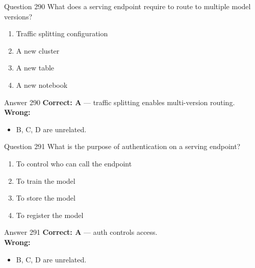 \documentclass[aspectratio=169,11pt]{beamer}
\begin{document}
	\begin{frame}{Question 290}
		What does a serving endpoint require to route to multiple model versions?
		\begin{enumerate}[label=\Alph*.]
			\item Traffic splitting configuration
			\item A new cluster
			\item A new table
			\item A new notebook
		\end{enumerate}
	\end{frame}
	\begin{frame}{Answer 290}
		\textbf{Correct: A} --- traffic splitting enables multi-version routing.\\
		\vspace{0.5em}
		\textbf{Wrong:}
		\begin{itemize}
			\item B, C, D are unrelated.
		\end{itemize}
	\end{frame}
	
	\begin{frame}{Question 291}
		What is the purpose of authentication on a serving endpoint?
		\begin{enumerate}[label=\Alph*.]
			\item To control who can call the endpoint
			\item To train the model
			\item To store the model
			\item To register the model
		\end{enumerate}
	\end{frame}
	\begin{frame}{Answer 291}
		\textbf{Correct: A} --- auth controls access.\\
		\vspace{0.5em}
		\textbf{Wrong:}
		\begin{itemize}
			\item B, C, D are unrelated.
		\end{itemize}
	\end{frame}
	
\end{document}
